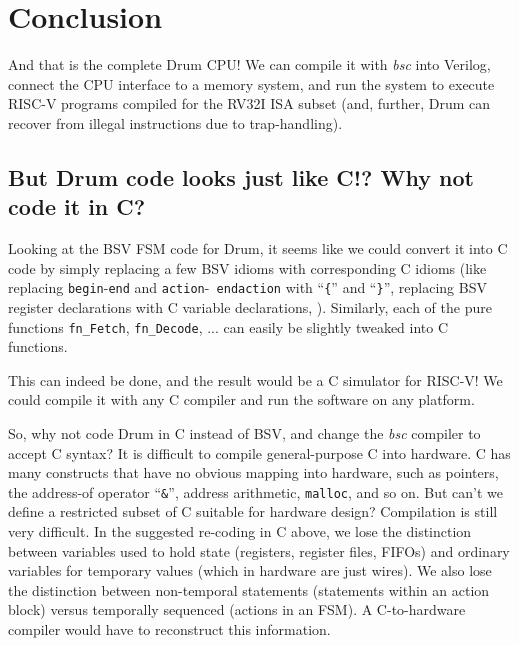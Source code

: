 
\section{Conclusion}

And that is the complete Drum CPU!  We can compile it with \emph{bsc}
into Verilog, connect the CPU interface to a memory system, and run
the system to execute RISC-V programs compiled for the RV32I ISA
subset (and, further, Drum can recover from illegal instructions due
to trap-handling).


\subsection{But Drum code looks just like C!?  Why not code it in C?}

Looking at the BSV FSM code for Drum, it seems like we could convert
it into C code by simply replacing a few BSV idioms with corresponding
C idioms (like replacing {\tt begin}-{\tt end} and {\tt action}-{\tt
endaction} with ``{\tt \{}'' and ``{\tt \}}'', replacing BSV register
declarations with C variable declarations, {\etc}).  Similarly, each
of the pure functions {\tt fn\_Fetch}, {\tt fn\_Decode}, ...  can
easily be slightly tweaked into C functions.

This can indeed be done, and the result would be a C simulator for
RISC-V!  We could compile it with any C compiler and run the software
on any platform.

So, why not code Drum in C instead of BSV, and change the \emph{bsc}
compiler to accept C syntax?  It is difficult to compile
general-purpose C into hardware.  C has many constructs that have no
obvious mapping into hardware, such as pointers, the address-of
operator ``\verb|&|'', address arithmetic, \verb|malloc|, and so on.
But can't we define a restricted subset of C suitable for hardware
design?  Compilation is still very difficult.  In the suggested
re-coding in C above, we lose the distinction between variables used
to hold state (registers, register files, FIFOs) and ordinary
variables for temporary values (which in hardware are just wires).  We
also lose the distinction between non-temporal statements (statements
within an action block) versus temporally sequenced (actions in an
FSM).  A C-to-hardware compiler would have to reconstruct this
information.

